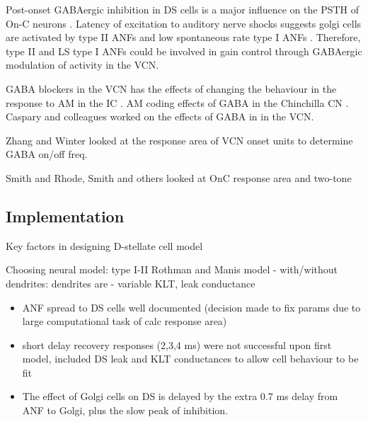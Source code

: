 \medskip{}

Post-onset GABAergic inhibition in DS cells is a major influence on the PSTH of
On-C neurons \citep{FerragamoGoldingEtAl:1998a,EvansZhao:1998}. Latency of
excitation to auditory nerve shocks suggests golgi cells are activated by type
II ANFs and low spontaneous rate type I ANFs \citep{BensonBerglundEtAl:1996,
  FerragamoGoldingEtAl:1998}. Therefore, type II and LS type I ANFs could be
involved in gain control through GABAergic modulation of activity in the VCN.

\medskip{}

 GABA blockers in the VCN has the
effects of changing the behaviour in the response to AM in the IC
\citep{CasparyPalombiEtAl:2002}.  AM coding effects of GABA in the Chinchilla CN
\citep{BackoffShadduckEtAl:1999}.  \citep{CasparyBackoffEtAl:1994} Caspary and
colleagues worked on the effects of GABA in in the VCN\@.

Zhang and Winter looked at the response area of VCN onset units to
determine GABA on/off freq. 

Smith and Rhode, Smith and others looked at OnC response area and two-tone



\subsection{Implementation}
 
Key factors in designing D-stellate cell model

\medskip{}

Choosing neural model: type I-II Rothman and Manis model
  - with/without dendrites: dendrites are 
  - variable KLT, leak conductance

\begin{itemize}
\item  ANF spread to DS cells well documented (decision made to
    fix params due to large computational task of calc response area) 
\item  short delay recovery responses (2,3,4 ms) were not successful upon
    first model, included DS leak and KLT conductances to allow cell
    behaviour to be fit
\item The effect of Golgi cells on DS is delayed by the extra 0.7 ms
    delay from ANF to Golgi, plus the slow peak of \GABAa inhibition.
\end{itemize}

\medskip{}

